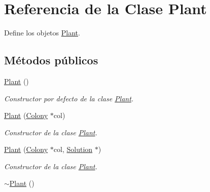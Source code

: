 \hypertarget{class_plant}{\section{Referencia de la Clase Plant}
\label{class_plant}
}


Define los objetos \hyperlink{class_plant}{Plant}.  


\subsection*{Métodos públicos}
\begin{DoxyCompactItemize}
\item 
\hypertarget{class_plant_aeebba67fbf33e3087e9035f41289a83a}{\hyperlink{class_plant_aeebba67fbf33e3087e9035f41289a83a}{Plant} ()}\label{class_plant_aeebba67fbf33e3087e9035f41289a83a}

\begin{DoxyCompactList}\small\item\em Constructor por defecto de la clase \hyperlink{class_plant}{Plant}. \end{DoxyCompactList}\item 
\hyperlink{class_plant_ae4e71ef08f69aa77ed93eba7e8398ff4}{Plant} (\hyperlink{class_colony}{Colony} $\ast$col)
\begin{DoxyCompactList}\small\item\em Constructor de la clase \hyperlink{class_plant}{Plant}. \end{DoxyCompactList}\item 
\hyperlink{class_plant_adf981553a347cc9f2769c94e3fdf5165}{Plant} (\hyperlink{class_colony}{Colony} $\ast$col, \hyperlink{class_solution}{Solution} $\ast$)
\begin{DoxyCompactList}\small\item\em Constructor de la clase \hyperlink{class_plant}{Plant}. \end{DoxyCompactList}\item 
\hypertarget{class_plant_ab0effb2b143e6da7b65ebd13a3b1fc29}{\hyperlink{class_plant_ab0effb2b143e6da7b65ebd13a3b1fc29}{$\sim$\+Plant} ()}\label{class_plant_ab0effb2b143e6da7b65ebd13a3b1fc29}


\end{DoxyCompactItemize}
